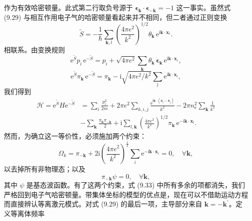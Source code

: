 作为有效哈密顿量。此式第二行取负号源于 $\boldsymbol{\epsilon}_{\mathbf{k}}\cdot\boldsymbol{\epsilon}_{-\mathbf{k}}=-1$ 这一事实。虽然式 (9.29) 与相互作用电子气的哈密顿量看起来并不相同，但二者通过正则变换
\begin{equation*}
\tilde{S}=-\frac{1}{\hbar}\sum_{\mathbf{k},l}\left(\frac{4\pi e^2}{k^2}\right)^{1/2}\theta_{\mathbf{k}}\,\mathrm{e}^{\mathrm{i}\mathbf{k}\cdot\mathbf{x}_l}.\tag{9.30}
\end{equation*}
相联系。由变换规则
\begin{equation*}
\mathrm{e}^{\tilde{S}}p_i\,\mathrm{e}^{-\tilde{S}}=p_i+\sqrt{4\pi e^2}\sum_{\mathbf{k}}\theta_{\mathbf{k}}\,\boldsymbol{\epsilon}_{\mathbf{k}}\,\mathrm{e}^{\mathrm{i}\mathbf{k}\cdot\mathbf{x}_i},\tag{9.31}
\end{equation*}
\begin{equation*}
\mathrm{e}^{\tilde{S}}\pi_{\mathbf{k}}\,\mathrm{e}^{-\tilde{S}}=\pi_{\mathbf{k}}-\mathrm{i}\sqrt{4\pi e^2/k^2}\sum_l\mathrm{e}^{\mathrm{i}\mathbf{k}\cdot\mathbf{x}_l},\tag{9.32}
\end{equation*}
我们得到
\begin{equation*}
\begin{aligned}
\mathcal{H}=\mathrm{e}^{\tilde{S}}H\mathrm{e}^{-\tilde{S}}&=\sum_i\frac{p_i^2}{2m}+2\pi e^2\sum_{k,i,j}\frac{\mathrm{e}^{\mathrm{i}\mathbf{k}\cdot(\mathbf{x}_i-\mathbf{x}_j)}}{k^2}-2\pi n_{\mathrm{e}}^2\sum_{\mathbf{k}}\frac{1}{k^2}\\
&-\sum_{\mathbf{k}}\frac{\pi_{\mathbf{k}}\pi_{-\mathbf{k}}}{2}+\mathrm{i}\sum_{l,\mathbf{k}}\left(\frac{4\pi e^2}{k^2}\right)^{1/2}\pi_{\mathbf{k}}\,\mathrm{e}^{-\mathrm{i}\mathbf{k}\cdot\mathbf{x}_l}.
\end{aligned}\tag{9.33}
\end{equation*}
然而，为确立这一等价性，必须施加两个约束：
\begin{equation*}
\Omega_k=\pi_{-\mathbf{k}}+2\mathrm{i}\left(\frac{4\pi e^2}{k^2}\right)^{\frac{1}{2}}\sum_i\mathrm{e}^{-\mathrm{i}\mathbf{k}\cdot\mathbf{x}_i}=0,\quad\forall\mathbf{k},\tag{9.34}
\end{equation*}
以去掉所有非物理态；以及
\begin{equation*}
\pi_{-\mathbf{k}}\psi=0,\quad\forall\mathbf{k},\tag{9.35}
\end{equation*}
其中 $\psi$ 是基态波函数。有了这两个约束，式 (9.33) 中所有多余的项都消失，我们严格回到电子气哈密顿量。带集体坐标的模型的优点是，现在可以不借助运动方程而直接辨认等离激元模式。对式 (9.29) 的最后一项，主导部分来自 $\mathbf{k}=-\mathbf{k}^{\prime}$。定义等离体频率

